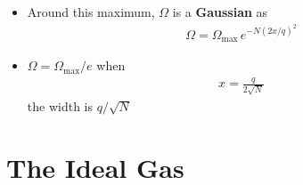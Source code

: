 \documentclass{book}
\begin{document}
\begin{itemize}
	\item Around this maximum, $\Omega$ is a \textbf{Gaussian} as
	      \begin{align}
		      \Omega = \Omega_{\text{max}} \, e^{-N(2x/q)^2}
	      \end{align}
	\item  $\Omega = \Omega_{\text{max}}/e$ when
	      \begin{align*}
		      x = \frac{q}{2 \sqrt{N}}
	      \end{align*}
	      the width is $q/\sqrt{N}$
\end{itemize}


\section{The Ideal Gas}%
\label{sec:ideal gas multiplcity}
\end{document}
